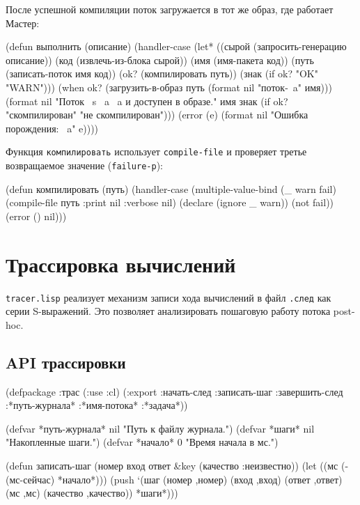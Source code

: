 \documentclass[11pt,a4paper]{article}
\begin{document}
После успешной компиляции поток загружается в тот же образ, где работает Мастер:

\begin{lispcode}[caption={мастер/потоки/порождатель.lisp — загрузка результата в образ}]
(defun выполнить (описание)
  (handler-case
      (let* ((сырой (запросить-генерацию описание))
             (код   (извлечь-из-блока сырой))
             (имя   (имя-пакета код))
             (путь  (записать-поток имя код))
             (ok?   (компилировать путь))
             (знак  (if ok? "OK" "WARN")))
        (when ok?
          (загрузить-в-образ путь
            (format nil "поток-~a" имя)))
        (format nil "Поток ~s ~a ~a и доступен в образе."
                имя знак (if ok? "скомпилирован" "не скомпилирован")))
    (error (e)
      (format nil "Ошибка порождения: ~a" e))))
\end{lispcode}

Функция \texttt{компилировать} использует \texttt{compile-file} и проверяет третье возвращаемое значение (\texttt{failure-p}):

\begin{lispcode}[caption={мастер/потоки/порождатель.lisp — компиляция}]
(defun компилировать (путь)
  (handler-case
      (multiple-value-bind (_ warn fail)
          (compile-file путь :print nil :verbose nil)
        (declare (ignore _ warn))
        (not fail))
    (error () nil)))
\end{lispcode}

\section{Трассировка вычислений}
\label{sec:tracer}

\texttt{tracer.lisp} реализует механизм записи хода вычислений в файл \texttt{.след} как серии S-выражений. Это позволяет анализировать пошаговую работу потока post-hoc.

\subsection{API трассировки}

\begin{lispcode}[caption={подмастерье/tracer.lisp — API трассировки}]
(defpackage :трас
  (:use :cl)
  (:export :начать-след :записать-шаг :завершить-след
           :*путь-журнала* :*имя-потока* :*задача*))

(defvar *путь-журнала* nil "Путь к файлу журнала.")
(defvar *шаги*         nil "Накопленные шаги.")
(defvar *начало*       0   "Время начала в мс.")

(defun записать-шаг (номер вход ответ &key (качество :неизвестно))
  (let ((мс (- (мс-сейчас) *начало*)))
    (push `(шаг (номер ,номер)
                (вход  ,вход)
                (ответ ,ответ)
                (мс    ,мс)
                (качество ,качество))
          *шаги*)))
\end{lispcode}
\end{document}
